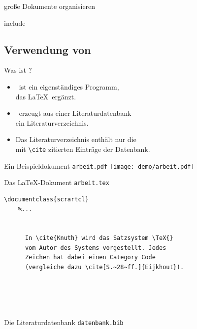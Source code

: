 \begin{Frame}
  große Dokumente organisieren

  include
\end{Frame}

\jonny


\subsection{Verwendung von \BibTeX}

\begin{Frame}[fragile]{Was ist \BibTeX?}
  \begin{itemize}
    \item \BibTeX\ ist ein \alert{eigenständiges Programm},\\
    das \LaTeX\ ergänzt.
    \item \BibTeX\ erzeugt aus einer \alert{Literaturdatenbank}\\
      ein \alert{Literaturverzeichnis}.
    \item Das Literaturverzeichnis enthält \alert{nur} die\\
      mit \lstinline-\cite- \alert{zitierten Einträge} der Datenbank.
  \end{itemize}
\end{Frame}

\begin{Frame}[t]{Ein Beispieldokument \texttt{arbeit.pdf}}
  \texttt{[image: demo/arbeit.pdf]}
\end{Frame}

\begin{Frame}[fragile]{Das \LaTeX-Dokument \texttt{arbeit.tex}}
  \begin{lstlisting}[gobble=4]
    \documentclass{scrartcl}
    %...

    
      In \cite{Knuth} wird das Satzsystem \TeX{}
      vom Autor des Systems vorgestellt. Jedes
      Zeichen hat dabei einen Category Code
      (vergleiche dazu \cite[S.~28~ff.]{Eijkhout}).

      
      
    
  \end{lstlisting}
\end{Frame}

\begin{Frame}{Die Literaturdatenbank \texttt{datenbank.bib}}
  
\end{Frame}

